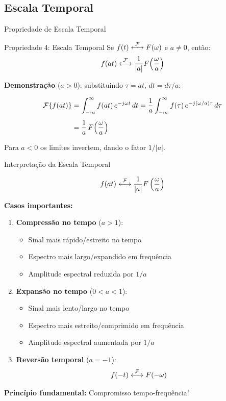 
\subsection{Escala Temporal}

\begin{frame}{Propriedade de Escala Temporal}

\begin{block}{Propriedade 4: Escala Temporal}
Se $f(t) \mathrel{\overset{\mathcal{F}}{\longleftrightarrow}} F(\omega)$ e $a \neq 0$, então:
\[
f(at) \mathrel{\overset{\mathcal{F}}{\longleftrightarrow}} \frac{1}{|a|} F\!\left(\frac{\omega}{a}\right)
\]
\end{block}

\textbf{Demonstração} ($a>0$): substituindo $\tau = at$, $dt = d\tau/a$:

\begin{align*}
\mathcal{F}\{f(at)\}
  &= \int_{-\infty}^{\infty} f(at)\,e^{-j\omega t}\,dt
   = \frac{1}{a}\int_{-\infty}^{\infty} f(\tau)\,e^{-j(\omega/a)\tau}\,d\tau \\[4pt]
  &= \frac{1}{a}\,F\!\left(\frac{\omega}{a}\right)
\end{align*}

Para $a < 0$ os limites invertem, dando o fator $1/|a|$.

\end{frame}


\begin{frame}{Interpretação da Escala Temporal}

\[
f(at) \mathrel{\overset{\mathcal{F}}{\longleftrightarrow}} \frac{1}{|a|} F\left(\frac{\omega}{a}\right)
\]

\textbf{Casos importantes:}

\begin{enumerate}
\item \textbf{Compressão no tempo} ($a > 1$):
   \begin{itemize}
   \item Sinal mais rápido/estreito no tempo
   \item Espectro mais largo/expandido em frequência
   \item Amplitude espectral reduzida por $1/a$
   \end{itemize}

\item \textbf{Expansão no tempo} ($0 < a < 1$):
   \begin{itemize}
   \item Sinal mais lento/largo no tempo
   \item Espectro mais estreito/comprimido em frequência
   \item Amplitude espectral aumentada por $1/a$
   \end{itemize}

\item \textbf{Reversão temporal} ($a = -1$):
   \[
   f(-t) \mathrel{\overset{\mathcal{F}}{\longleftrightarrow}} F(-\omega)
   \]
\end{enumerate}

\textbf{Princípio fundamental:} Compromisso tempo-frequência!

\end{frame}

